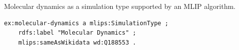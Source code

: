 Molecular dynamics as a simulation type supported by an MLIP algorithm.
\begin{lstlisting}[language=turtle]
ex:molecular-dynamics a mlips:SimulationType ;
    rdfs:label "Molecular Dynamics" ;
    mlips:sameAsWikidata wd:Q188553 .
\end{lstlisting}
